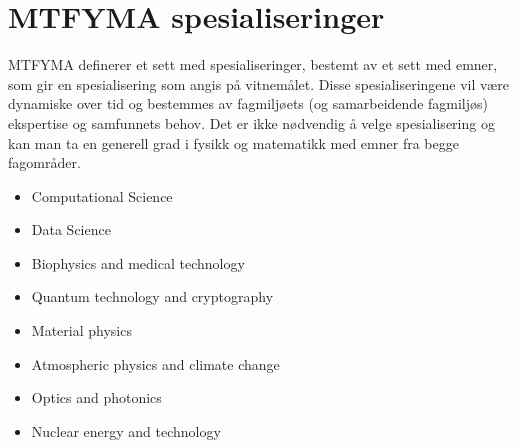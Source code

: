 \chapter{MTFYMA spesialiseringer}
\label{c:mtfyma-spec}

MTFYMA definerer et sett med spesialiseringer, bestemt av et sett med emner, som gir en spesialisering som angis på vitnemålet. Disse spesialiseringene vil være dynamiske over tid og bestemmes av fagmiljøets (og samarbeidende fagmiljøs) ekspertise og samfunnets behov. Det er ikke nødvendig å velge spesialisering og kan man ta en generell grad i fysikk og matematikk med emner fra begge fagområder.

\begin{itemize}
	\item Computational Science
	\item Data Science
	\item Biophysics and medical technology
	\item Quantum technology and cryptography
	\item Material physics
	\item Atmospheric physics and climate change
	\item Optics and photonics
	\item Nuclear energy and technology
\end{itemize}
